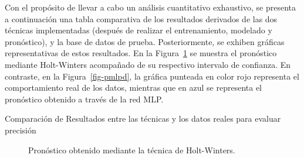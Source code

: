 \documentclass[
  letterpaper,
  DIV=11,
  numbers=noendperiod]{scrreport}
\theoremstyle{plain}
\theoremstyle{definition}
\theoremstyle{definition}
\theoremstyle{plain}
\theoremstyle{remark}
\begin{document}
Con el propósito de llevar a cabo un análisis cuantitativo exhaustivo,
se presenta a continuación una tabla comparativa de los resultados
derivados de las dos técnicas implementadas (después de realizar el
entrenamiento, modelado y pronóstico), y la base de datos de prueba.
Posteriormente, se exhiben gráficas representativas de estos resultados.
En la Figura~\ref{fig-phwd} se muestra el pronóstico mediante
Holt-Winters acompañado de su respectivo intervalo de confianza. En
contraste, en la Figura~\ref{fig-pmlpd}, la gráfica punteada en color
rojo representa el comportamiento real de los datos, mientras que en
azul se representa el pronóstico obtenido a través de la red MLP.

\begin{table}

\caption{\label{tbl-forecastd}Comparación de Resultados entre las
técnicas y los datos reales para evaluar precisión}


\end{table}%

\begin{figure}


\caption{\label{fig-phwd}Pronóstico obtenido mediante la técnica de
Holt-Winters.}

\end{figure}%
\end{document}

